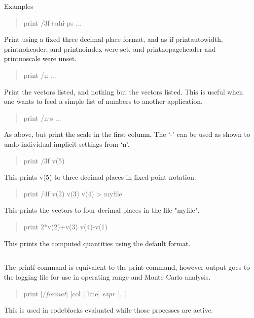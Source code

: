 Examples
\begin{quote}\vt
print /3f+ahi-ps ...
\end{quote}
Print using a fixed three decimal place format, and as if {\et
printautowidth}, {\et printnoheader}, and {\et printnoindex} were set,
and {\et printnopageheader} and {\et printnoscale} were unset.
\begin{quote}\vt
print /n ...
\end{quote}
Print the vectors listed, and nothing but the vectors listed.  This is
useful when one wants to feed a simple list of numbers to another
application.
\begin{quote}\vt
print /n-s ...
\end{quote}
As above, but print the scale in the first column.  The `{\vt -}' can
be used as shown to undo individual implicit settings from `{\vt n}'.
\begin{quote}\vt
print /3f v(5)
\end{quote}
This prints v(5) to three decimal places in fixed-point notation.
\begin{quote}\vt
print /4f v(2) v(3) v(4) > myfile
\end{quote}
This prints the vectors to four decimal places in the file "myfile".
\begin{quote}\vt
print 2*v(2)+v(3) v(4)-v(1)
\end{quote}
This prints the computed quantities using the default format.

\subsection{}


The {\cb printf} command is equivalent to the {\cb print} command,
however output goes to the logging file for use in operating range and
Monte Carlo analysis.
\begin{quote}\vt
print [/{\it format\/}] [col | line] {\it expr\/} [...]
\end{quote}
This is used in codeblocks evaluated while those processes are active.

\subsection{}

